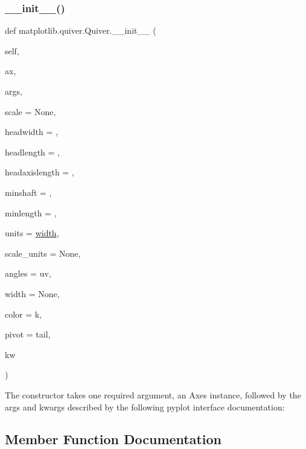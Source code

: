 \subsubsection{\texorpdfstring{\+\_\+\+\_\+init\+\_\+\+\_\+()}{\_\_init\_\_()}}
{\footnotesize\ttfamily def matplotlib.\+quiver.\+Quiver.\+\_\+\+\_\+init\+\_\+\+\_\+ (\begin{DoxyParamCaption}\item[{}]{self,  }\item[{}]{ax,  }\item[{}]{args,  }\item[{}]{scale = {\ttfamily None},  }\item[{}]{headwidth = {},  }\item[{}]{headlength = {},  }\item[{}]{headaxislength = {},  }\item[{}]{minshaft = {},  }\item[{}]{minlength = {},  }\item[{}]{units = {\ttfamily \textquotesingle{}\hyperlink{classmatplotlib_1_1quiver_1_1Quiver_a75d5ada927ce226d1e4660ec95b2bf75}{width}\textquotesingle{}},  }\item[{}]{scale\+\_\+units = {\ttfamily None},  }\item[{}]{angles = {\ttfamily \textquotesingle{}uv\textquotesingle{}},  }\item[{}]{width = {\ttfamily None},  }\item[{}]{color = {\ttfamily \textquotesingle{}k\textquotesingle{}},  }\item[{}]{pivot = {\ttfamily \textquotesingle{}tail\textquotesingle{}},  }\item[{}]{kw }\end{DoxyParamCaption})}

\begin{DoxyVerb}The constructor takes one required argument, an Axes
instance, followed by the args and kwargs described
by the following pyplot interface documentation:
\end{DoxyVerb}
 

\subsection{Member Function Documentation}
\mbox{\label{classmatplotlib_1_1quiver_1_1Quiver_ae04f59d5391cda9f45331f602d5bde48}} 

